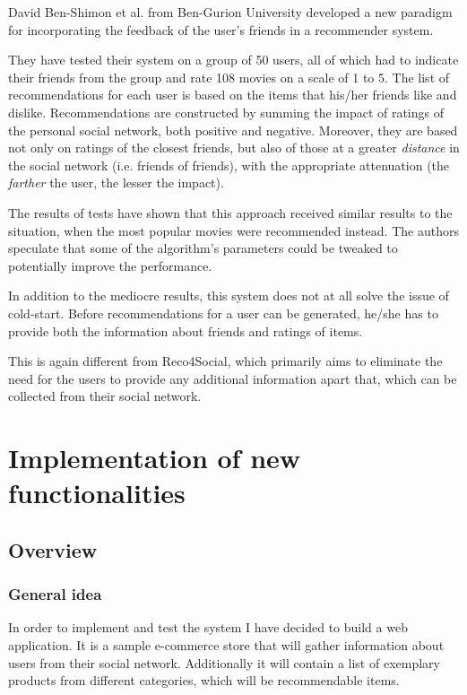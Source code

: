 \documentclass[12pt]{report}
\begin{document}
David Ben-Shimon et al. \cite{ben_gurion} from Ben-Gurion University developed a new paradigm for incorporating the feedback of the user's friends in a recommender system. 

They have tested their system on a group of 50 users, all of which had to indicate their friends from the group and rate 108 movies on a scale of 1 to 5. The list of recommendations for each user is based on the items that his/her friends like and dislike. Recommendations are constructed by summing the impact of ratings of the personal social network, both positive and negative. Moreover, they are based not only on ratings of the closest friends, but also of those at a greater \textit{distance} in the social network (i.e. friends of friends), with the appropriate attenuation (the \textit{farther} the user, the lesser the impact).

The results of tests have shown that this approach received similar results to the situation, when the most popular movies were recommended instead. The authors speculate that some of the algorithm's parameters could be tweaked to potentially improve the performance.

\hbox{}
In addition to the mediocre results, this system does not at all solve the issue of cold-start. Before recommendations for a user can be generated, he/she has to provide both the information about friends and ratings of items.

This is again different from Reco4Social, which primarily aims to eliminate the need for the users to provide any additional information apart that, which can be collected from their social network.




\chapter{Implementation of new functionalities}

\section{Overview}
\subsection{General idea}
In order to implement and test the system I have decided to build a web application. It is a sample e-commerce store that will gather information about users from their social network. Additionally it will contain a list of exemplary products from different categories, which will be recommendable items. 
\end{document}
